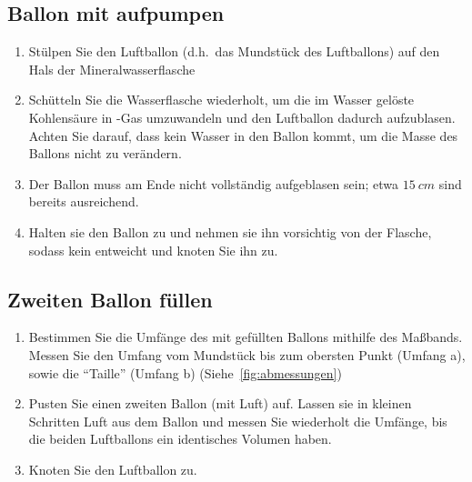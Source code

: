 \documentclass{article}
\begin{document}
      \subsection{Ballon mit \texorpdfstring{}{CO2} aufpumpen}
          \begin{enumerate}
              \item Stülpen Sie den Luftballon (d.h.\ das Mundstück des Luftballons) auf den Hals der Mineralwasserflasche
              \item Schütteln Sie die Wasserflasche wiederholt, um die im Wasser gelöste Kohlensäure in -Gas umzuwandeln und den Luftballon dadurch aufzublasen.
                    Achten Sie darauf, dass kein Wasser in den Ballon kommt, um die Masse des Ballons nicht zu verändern.
              \item Der Ballon muss am Ende nicht vollständig aufgeblasen sein; etwa \(\SI{15}{cm}\) sind bereits ausreichend.
              \item Halten sie den Ballon zu und nehmen sie ihn vorsichtig von der Flasche, sodass kein  entweicht und knoten Sie ihn zu.
          \end{enumerate}

      \subsection{Zweiten Ballon füllen}
          \begin{enumerate}[resume]
              \item Bestimmen Sie die Umfänge des mit  gefüllten Ballons mithilfe des Maßbands.
                    Messen Sie den Umfang vom Mundstück bis zum obersten Punkt (Umfang a), sowie die \enquote{Taille} (Umfang b) (Siehe~\ref{fig:abmessungen})
              \item Pusten Sie einen zweiten Ballon (mit Luft) auf. Lassen sie in kleinen Schritten Luft aus dem Ballon und messen Sie wiederholt die Umfänge,
                    bis die beiden Luftballons ein identisches Volumen haben.
              \item Knoten Sie den Luftballon zu.
          \end{enumerate}
\end{document}
